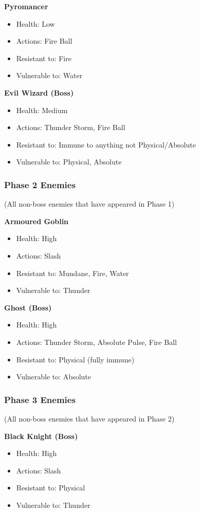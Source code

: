 \newpage
\textbf{Pyromancer}
\begin{itemize}
\item Health: Low
\item Actions: Fire Ball
\item Resistant to: Fire
\item Vulnerable to: Water
\end{itemize}

\textbf{Evil Wizard (Boss)}
\begin{itemize}
\item Health: Medium
\item Actions: Thunder Storm, Fire Ball
\item Resistant to: Immune to anything not Physical/Absolute
\item Vulnerable to: Physical, Absolute
\end{itemize}

\subsubsection{Phase 2 Enemies}

(All non-boss enemies that have appeared in Phase 1)

\textbf{Armoured Goblin}
\begin{itemize}
\item Health: High
\item Actions: Slash
\item Resistant to: Mundane, Fire, Water
\item Vulnerable to: Thunder
\end{itemize}

\textbf{Ghost (Boss)}
\begin{itemize}
\item Health: High
\item Actions: Thunder Storm, Absolute Pulse, Fire Ball
\item Resistant to: Physical (fully immune)
\item Vulnerable to: Absolute
\end{itemize}

\subsubsection{Phase 3 Enemies}

(All non-boss enemies that have appeared in Phase 2)

\textbf{Black Knight (Boss)}
\begin{itemize}
\item Health: High
\item Actions: Slash
\item Resistant to: Physical
\item Vulnerable to: Thunder
\end{itemize}

